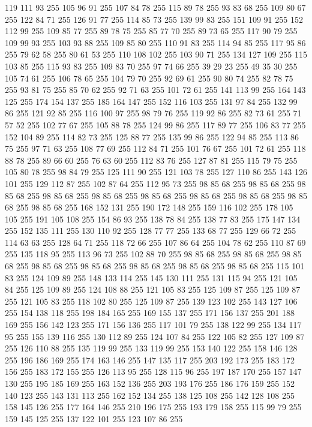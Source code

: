 119 111 93 255 105 96 91 255 107 84 78 255 115 89 78 255 93 83 68 255 109 80 67 255 122 84 71 255 126 91 77 255 114 85 73 255 139 99 83 255 151 109 91 255 152 112 99 255 109 85 77 255 89 78 75 255 85 77 70 255 89 73 65 255 117 90 79 255 109 99 93 255 103 93 88 255 109 85 80 255 110 91 83 255 114 94 85 255 117 95 86 255 79 62 58 255 80 61 53 255 110 108 102 255 103 90 71 255 134 127 109 255 115 103 85 255 115 93 83 255 109 83 70 255 97 74 66 255 39 29 23 255 49 35 30 255 105 74 61 255 106 78 65 255 104 79 70 255 92 69 61 255 90 80 74 255 82 78 75 255 93 81 75 255 85 70 62 255 92 71 63 255 101 72 61 255 141 113 99 255 164 143 125 255 174 154 137 255 185 164 147 255 152 116 103 255 131 97 84 255 132 99 86 255 121 92 85 255 116 100 97 255 98 79 76 255 119 92 86 255 82 73 61 255 71 57 52 255 102 77 67 255 105 88 78 255 124 99 86 255 117 89 77 255 106 83 77 255 152 104 89 255 114 82 73 255
125 88 77 255 135 99 86 255 122 94 85 255 113 86 75 255 97 71 63 255 108 77 69 255 112 84 71 255 101 76 67 255 101 72 61 255 118 88 78 255 89 66 60 255 76 63 60 255 112 83 76 255 127 87 81 255 115 79 75 255 105 80 78 255 98 84 79 255 125 111 90 255 121 103 78 255 127 110 86 255 143 126 101 255 129 112 87 255 102 87 64 255 112 95 73 255 98 85 68 255 98 85 68 255 98 85 68 255 98 85 68 255 98 85 68 255 98 85 68 255 98 85 68 255 98 85 68 255 98 85 68 255 98 85 68 255 168 152 131 255 190 172 148 255 159 116 102 255 178 105 105 255 191 105 108 255 154 86 93 255 138 78 84 255 138 77 83 255 175 147 134 255 152 135 111 255 130 110 92 255 128 77 77 255 133 68 77 255 129 66 72 255 114 63 63 255 128 64 71 255 118 72 66 255 107 86 64 255 104 78 62 255 110 87 69 255 135 118 95 255 113 96 73 255 102 88 70 255 98 85 68 255 98 85 68 255 98 85 68 255 98 85 68 255 98 85 68 255 98 85 68 255 98 85 68 255
98 85 68 255 115 101 83 255 124 109 89 255 148 133 114 255 145 130 111 255 131 115 94 255 121 105 84 255 125 109 89 255 124 108 88 255 121 105 83 255 125 109 87 255 125 109 87 255 121 105 83 255 118 102 80 255 125 109 87 255 139 123 102 255 143 127 106 255 154 138 118 255 198 184 165 255 169 155 137 255 171 156 137 255 201 188 169 255 156 142 123 255 171 156 136 255 117 101 79 255 138 122 99 255 134 117 95 255 155 139 116 255 130 112 89 255 124 107 84 255 122 105 82 255 127 109 87 255 126 110 88 255 135 119 99 255 133 119 99 255 153 140 122 255 158 146 128 255 196 186 169 255 174 163 146 255 147 135 117 255 203 192 173 255 183 172 156 255 183 172 155 255 126 113 95 255 128 115 96 255 197 187 170 255 157 147 130 255 195 185 169 255 163 152 136 255 203 193 176 255 186 176 159 255 152 140 123 255 143 131 113 255 162 152 134 255 138 125 108 255 142 128 108 255 158 145 126 255 177 164 146 255 210 196 175 255 193 179 158 255 115 99 79 255 159 145 125 255 137 122 101 255 123 107 86 255
